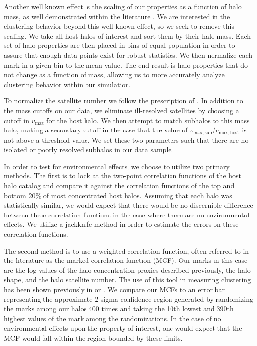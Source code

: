 \documentclass[usenatbib,usegraphicx,letterpaper]{mn2e}
\begin{document}
Another well known effect is the scaling of our properties as a function of halo mass, as well demonstrated within the literature \citep{duffy08}. We are interested in the clustering behavior beyond this well known effect, so we seek to remove this scaling. We take all host halos of interest and sort them by their halo mass. Each set of halo properties are then placed in bins of equal population in order to assure that enough data points exist for robust statistics. We then normalize each mark in a given bin to the mean value. The end result is halo properties that do not change as a function of mass, allowing us to more accurately analyze clustering behavior within our simulation.

To normalize the satellite number we follow the prescription of \citet{wechsler06}. In addition to the mass cutoffs on our data, we eliminate ill-resolved satellites by choosing a cutoff in $v_{\mathrm{max}}$ for the host halo. We then attempt to match subhalos to this mass halo, making a secondary cutoff in the case that the value of $v_{\mathrm{max,sub}} / v_{\mathrm{max,host}}$ is not above a threshold value. We set these two parameters such that there are no isolated or poorly resolved subhalos in our data sample.

In order to test for environmental effects, we choose to utilize two primary methods. The first is to look at the two-point correlation functions of the host halo catalog and compare it against the correlation functions of the top and bottom 20\% of most concentrated host halos. Assuming that each halo was statistically similar, we would expect that there would be no discernible difference between these correlation functions in the case where there are no environmental effects. We utilize a jackknife method in order to estimate the errors on these correlation functions.

The second method is to use a weighted correlation function, often referred to in the literature as the marked correlation function (MCF). Our marks in this case are the log values of the halo concentration proxies described previously, the halo shape, and the halo satellite number. The use of this tool in measuring clustering has been shown previously in \citet{wechsler06} or \citet{harker06}. We compare our MCFs to an error bar representing the approximate 2-sigma confidence region generated by randomizing the marks among our halos 400 times and taking the 10th lowest and 390th highest values of the mark among the randomizations. In the case of no environmental effects upon the property of interest, one would expect that the MCF would fall within the region bounded by these limits.
\end{document}
